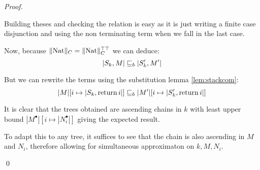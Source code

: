 \begin{proof}
\begin{itemize}
            Building theses and checking the relation is easy as it is just 
            writing a finite case disjunction and using the non terminating 
            term when we fall in the last case.

            Now, because $\| \textnormal{Nat} \|_C = \| \textnormal{Nat} \|_C^{\top\top}$ we can 
            deduce:
            \begin{equation*}
                |S_k, M| \sqsubseteq_b |S_k', M'|
            \end{equation*}

            But we can rewrite the terms using the substitution lemma
            \ref{lem:stackcom}: 
            \begin{equation*}
                |M|[i \mapsto |S_k, \operatorname{return} i|] \sqsubseteq_b |M'|[ i \mapsto |S_k', \operatorname{return}
                i|]
            \end{equation*}

            It is clear that the trees obtained are ascending chains in $k$
            with least upper bound $|M^\bullet|[i \mapsto |N_i^\bullet|]$ 
            giving the expected result.

            To adapt this to any tree, it suffices to see that the chain 
            is also ascending in $M$ and $N_i$, therefore allowing for 
            simultaneous approximaton on $k,M,N_i$.
    \end{itemize} 

\qed\end{proof}

